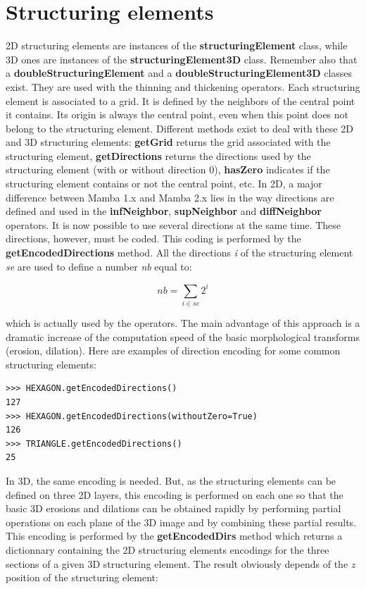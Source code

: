 \documentclass[a4paper,10pt,oneside]{article}
\begin{document}
\section{Structuring elements}
\label{cha:structelem}
2D structuring elements are instances of the \textbf{structuringElement} class, while 3D ones are instances of the \textbf{structuringElement3D}
class. Remember also that a \textbf{doubleStructuringElement} and a \textbf{doubleStructuringElement3D} classes exist. They are used with
the thinning and thickening operators.
Each structuring element is associated to a grid. It is defined by the neighbors of the central point it contains. Its origin is always
the central point, even when this point does not belong to the structuring element. Different methods exist to deal with these 2D and
3D structuring elements: \textbf{getGrid} returns the grid associated with the structuring element, \textbf{getDirections} returns the
directions used by the structuring element (with or without direction 0), \textbf{hasZero} indicates if the structuring element contains
or not the central point, etc.
In 2D, a major difference between Mamba 1.x and Mamba 2.x lies in the way directions are defined and used in the \textbf{infNeighbor}, \textbf{supNeighbor}
and \textbf{diffNeighbor} operators. It is now possible to use several directions at the same time. These directions, however, must be coded.
This coding is performed by the \textbf{getEncodedDirections} method. All the directions \emph{i} of the structuring element \emph{se} are used to define a
number \emph{nb} equal to:

\begin{displaymath}
nb = \sum_{i \in se} 2^i
\end{displaymath}

which is actually used by the operators. The main advantage of this approach is a dramatic increase of the computation speed of the basic
morphological transforms (erosion, dilation). Here are examples of direction encoding for some common structuring elements:

\lstset{language=Python}
\begin{lstlisting}
>>> HEXAGON.getEncodedDirections()
127
>>> HEXAGON.getEncodedDirections(withoutZero=True)
126
>>> TRIANGLE.getEncodedDirections()
25
\end{lstlisting}

In 3D, the same encoding is needed. But, as the structuring elements can be defined on three 2D layers, this encoding is performed on each
one so that the basic 3D erosions and dilations can be obtained rapidly by performing partial operations on each plane of the 3D image and by
combining these partial results. This encoding is performed by the \textbf{getEncodedDirs} method which returns a dictionnary containing the 2D
structuring elements encodings for the three sections of a given 3D structuring element. The result obviously depends of the \emph{z} position of the
structuring element:
\end{document}
